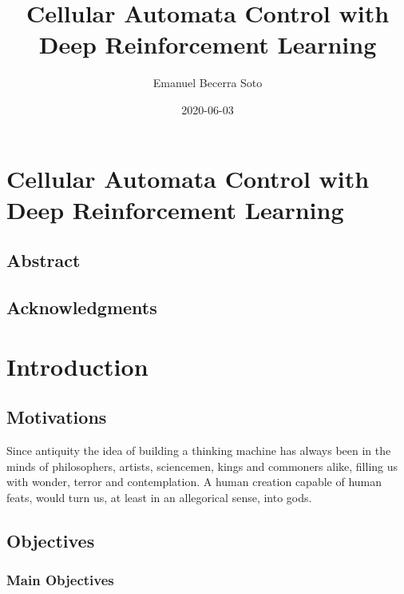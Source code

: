 \documentclass[
]{book}
\title{Cellular Automata Control with Deep Reinforcement Learning}
\author{Emanuel Becerra Soto}
\date{2020-06-03}
\begin{document}
\maketitle

{
\setcounter{tocdepth}{1}
\tableofcontents
}
\hypertarget{cellular-automata-control-with-deep-reinforcement-learning}{%
\chapter{Cellular Automata Control with Deep Reinforcement Learning}\label{cellular-automata-control-with-deep-reinforcement-learning}}

\hypertarget{abstract}{%
\section{Abstract}\label{abstract}}

\hypertarget{acknowledgments}{%
\section{Acknowledgments}\label{acknowledgments}}

\hypertarget{introduction}{%
\chapter{Introduction}\label{introduction}}

\hypertarget{motivations}{%
\section{Motivations}\label{motivations}}

Since antiquity the idea of building a thinking machine has always been in the minds of philosophers, artists, sciencemen, kings and commoners alike, filling us with wonder, terror and contemplation. A human creation capable of human feats, would turn us, at least in an allegorical sense, into gods.

\hypertarget{objectives}{%
\section{Objectives}\label{objectives}}

\hypertarget{main-objectives}{%
\subsection{Main Objectives}\label{main-objectives}}
\end{document}

